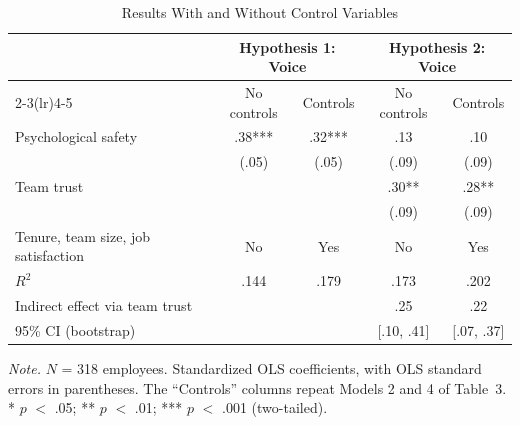 \documentclass[11pt]{article}
\begin{document}
\begin{table}[ht]
\centering
\begin{threeparttable}
\caption{Results With and Without Control Variables}
\small
\begin{tabular}{lcccc}
\toprule
 & \multicolumn{2}{c}{Hypothesis 1: Voice} & \multicolumn{2}{c}{Hypothesis 2: Voice} \\
\cmidrule(lr){2-3}\cmidrule(lr){4-5}
 & No controls & Controls & No controls & Controls \\
\midrule
Psychological safety & .38*** & .32*** & .13 & .10 \\
 & (.05) & (.05) & (.09) & (.09) \\
Team trust & & & .30** & .28** \\
 & & & (.09) & (.09) \\
Tenure, team size, job satisfaction & No & Yes & No & Yes \\
\midrule
$R^2$ & .144 & .179 & .173 & .202 \\
Indirect effect via team trust & & & .25 & .22 \\
95\% CI (bootstrap) & & & [.10, .41] & [.07, .37] \\
\bottomrule
\end{tabular}
\begin{tablenotes}\footnotesize
\item \textit{Note.} $N$ = 318 employees. Standardized OLS coefficients, with OLS standard errors in parentheses. The ``Controls'' columns repeat Models 2 and 4 of Table~3. * $p$ $<$ .05; ** $p$ $<$ .01; *** $p$ $<$ .001 (two-tailed).
\end{tablenotes}
\end{threeparttable}
\end{table}
\end{document}
